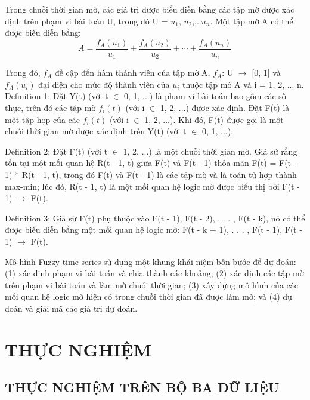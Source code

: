 \documentclass[conference]{IEEEtran}
\begin{document}
Trong chuỗi thời gian mờ, các giá trị được biểu diễn bằng các tập mờ được xác định trên phạm vi bài toán U, trong đó U = {$u_1$, $u_2$,...$u_n$}. Một tập mờ A có thể được biểu diễn bằng:
\[A = \frac{f_A(u_1)}{u_1} + \frac{f_A(u_2)}{u_2} + \cdots + \frac{f_A(u_n)}{u_n}\]

Trong đó, $f_A$ đề cập đến hàm thành viên của tập mờ A, $f_A$: U $\to$ [0, 1] và $f_A(u_i)$ đại diện cho mức độ thành viên của $u_i$ thuộc tập mờ A và i = 1, 2, ... n.
Definition 1: Đặt Y(t) (với t $\in$ 0, 1, ...) là phạm vi bài toán bao gồm các số thực, trên đó các tập mờ $f_i(t)$ (với i $\in$ 1, 2, ...) được xác định. Đặt F(t) là một tập hợp của các $f_i(t)$ (với i $\in$ 1, 2, ...). Khi đó, F(t) được gọi là một chuỗi thời gian mờ được xác định trên Y(t) (với t $\in$ 0, 1, ...).

Definition 2: Đặt F(t) (với t $\in$ 1, 2, ...) là một chuỗi thời gian mờ. Giả sử rằng tồn tại một mối quan hệ R(t - 1, t) giữa F(t) và F(t - 1) thỏa mãn F(t) = F(t - 1) * R(t - 1, t), trong đó F(t) và F(t - 1) là các tập mờ và là toán tử hợp thành max-min; lúc đó, R(t - 1, t) là một mối quan hệ logic mờ được biểu thị bởi F(t - 1) $\to$ F(t).

Definition 3: Giả sử F(t) phụ thuộc vào F(t - 1), F(t - 2), . . . , F(t - k), nó có thể được biểu diễn bằng một mối quan hệ logic mờ: F(t - k + 1), . . . , F(t - 1), F(t - 1) $\to$ F(t).

Mô hình Fuzzy time series sử dụng một khung khái niệm bốn bước để dự đoán: (1) xác định phạm vi bài toán và chia thành các khoảng; (2) xác định các tập mờ trên phạm vi bài toán và làm mờ chuỗi thời gian; (3) xây dựng mô hình của các mối quan hệ logic mờ hiện có trong chuỗi thời gian đã được làm mờ; và (4) dự đoán và giải mã các giá trị dự đoán.
\section{THỰC NGHIỆM}
\subsection{THỰC NGHIỆM TRÊN BỘ BA DỮ LIỆU}
\end{document}
